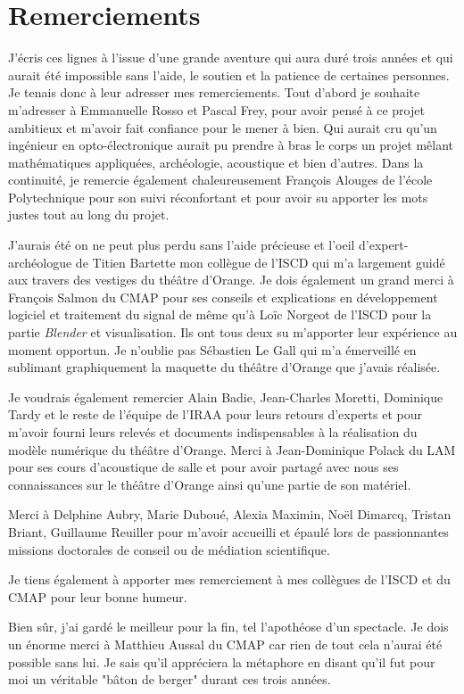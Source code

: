 \chapter*{Remerciements}

J'écris ces lignes à l'issue d'une grande aventure qui aura duré trois années et qui aurait été impossible sans l'aide, le soutien et la patience de certaines personnes. Je tenais donc à leur adresser mes remerciements. Tout d'abord je souhaite m'adresser à Emmanuelle Rosso et Pascal Frey, pour avoir pensé à ce projet ambitieux et m'avoir fait confiance pour le mener à bien. Qui aurait cru qu'un ingénieur en opto-électronique aurait pu prendre à bras le corps un projet mêlant mathématiques appliquées, archéologie, acoustique et bien d'autres. Dans la continuité, je remercie également chaleureusement François Alouges de l'école Polytechnique pour son suivi réconfortant et pour avoir su apporter les mots justes tout au long du projet. 

J'aurais été on ne peut plus perdu sans l'aide précieuse et l'oeil d'expert-archéologue de Titien Bartette mon collègue de l'ISCD qui m'a largement guidé aux travers des vestiges du théâtre d'Orange. Je dois également un grand merci à François Salmon du CMAP pour ses conseils et explications en développement logiciel et traitement du signal de même qu'à Loïc Norgeot de l'ISCD pour la partie \textit{Blender} et visualisation. Ils ont tous deux su m'apporter leur expérience au moment opportun. Je n'oublie pas Sébastien Le Gall qui m'a émerveillé en sublimant graphiquement la maquette du théâtre d'Orange que j'avais réalisée. 

Je voudrais également remercier Alain Badie, Jean-Charles Moretti, Dominique Tardy et le reste de l'équipe de l'IRAA pour leurs retours d'experts et pour m'avoir fourni leurs relevés et documents indispensables à la réalisation du modèle numérique du théâtre d'Orange. Merci à Jean-Dominique Polack du LAM pour ses cours d'acoustique de salle et pour avoir partagé avec nous ses connaissances sur le théâtre d'Orange ainsi qu'une partie de son matériel.

Merci à Delphine Aubry, Marie Duboué, Alexia Maximin, Noël Dimarcq, Tristan Briant, Guillaume Reuiller pour m'avoir accueilli et épaulé lors de passionnantes missions doctorales de conseil ou de médiation scientifique.

Je tiens également à apporter mes remerciement à mes collègues de l'ISCD et du CMAP pour leur bonne humeur.

Bien sûr, j'ai gardé le meilleur pour la fin, tel l'apothéose d'un spectacle. Je dois un énorme merci à Matthieu Aussal du CMAP car rien de tout cela n'aurai été possible sans lui. Je sais qu'il appréciera la métaphore en disant qu'il fut pour moi un véritable "bâton de berger" durant ces trois années.

